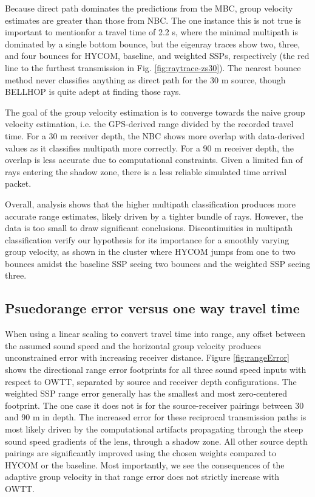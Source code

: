 Because direct path dominates the predictions from the MBC, group velocity estimates are greater than those from NBC.
The one instance this is not true is important to mention\textemdash for a travel time of 2.2 s, where the minimal multipath is dominated by a single bottom bounce, but the eigenray traces show two, three, and four bounces for HYCOM, baseline, and weighted SSPs, respectively (the red line to the furthest transmission in Fig. \ref{fig:raytrace-zs30}).
The nearest bounce method never classifies anything as direct path for the 30 m source, though BELLHOP is quite adept at finding those rays. 

The goal of the group velocity estimation is to converge towards the naive group velocity estimation, i.e. the GPS-derived range divided by the recorded travel time.
For a 30 m receiver depth, the NBC shows more overlap with data-derived values as it classifies multipath more correctly.
For a 90 m receiver depth, the overlap is less accurate due to computational constraints.
Given a limited fan of rays entering the shadow zone, there is a less reliable simulated time arrival packet.

Overall, analysis shows that the higher multipath classification produces more accurate range estimates, likely driven by a tighter bundle of rays.
However, the data is too small to draw significant conclusions.
Discontinuities in multipath classification verify our hypothesis for its importance for a smoothly varying group velocity, as shown in the cluster where HYCOM jumps from one to two bounces amidst the baseline SSP seeing two bounces and the weighted SSP seeing three.

\FloatBarrier
\subsection{Psuedorange error versus one way travel time}

When using a linear scaling to convert travel time into range, any offset between the assumed sound speed and the horizontal group velocity produces unconstrained error with increasing receiver distance.
Figure \ref{fig:rangeError} shows the directional range error footprints for all three sound speed inputs with respect to OWTT, separated by source and receiver depth configurations.
The weighted SSP range error generally has the smallest and most zero-centered footprint.
The one case it does not is for the source-receiver pairings between 30 and 90 m in depth.
The increased error for these reciprocal transmission paths is most likely driven by the computational artifacts propagating through the steep sound speed gradients of the lens, through a shadow zone. 
All other source depth pairings are significantly improved using the chosen weights compared to HYCOM or the baseline.
Most importantly, we see the consequences of the adaptive group velocity in that range error does not strictly increase with OWTT.

